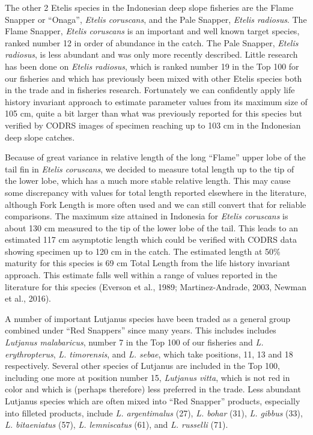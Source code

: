 The other 2 Etelis species in the Indonesian deep slope fisheries are the Flame Snapper or ``Onaga'', \textit{Etelis coruscans}, and the Pale Snapper, \textit{Etelis radiosus}. The Flame Snapper, \textit{Etelis coruscans} is an important and well known target species, ranked number 12 in order of abundance in the catch. The Pale Snapper, \textit{Etelis radiosus}, is less abundant and was only more recently described. Little research has been done on \textit{Etelis radiosus}, which is ranked number 19 in the Top 100 for our fisheries and which has previously been mixed with other Etelis species both in the trade and in fisheries research. Fortunately we can confidently apply life history invariant approach to estimate parameter values from its maximum size of 105 cm, quite a bit larger than what was previously reported for this species but verified by CODRS images of specimen reaching up to 103 cm in the Indonesian deep slope catches.

Because of great variance in relative length of the long ``Flame'' upper lobe of the tail fin in \textit{Etelis coruscans}, we decided to measure total length up to the tip of the lower lobe, which has a much more stable relative length. This may cause some discrepancy with values for total length reported elsewhere in the literature, although Fork Length is more often used and we can still convert that for reliable comparisons. The maximum size attained in Indonesia for \textit{Etelis coruscans} is about 130 cm measured to the tip of the lower lobe of the tail. This leads to an estimated 117 cm asymptotic length which could be verified with CODRS data showing specimen up to 120 cm in the catch. The estimated length at 50\% maturity for this species is 69 cm Total Length from the life history invariant approach. This estimate falls well within a range of values reported in the literature for this species (Everson et al., 1989; Martinez-Andrade, 2003, Newman et al., 2016).

A number of important Lutjanus species have been traded as a general group combined under ``Red Snappers'' since many years. This includes includes \textit{Lutjanus malabaricus}, number 7 in the Top 100 of our fisheries and \textit{L. erythropterus}, \textit{L. timorensis}, and \textit{L. sebae}, which take positions, 11, 13 and 18 respectively. Several other species of Lutjanus are included in the Top 100, including one more at position number 15, \textit{Lutjanus vitta}, which is not red in color and which is (perhaps therefore) less preferred in the trade. Less abundant Lutjanus species which are often mixed into ``Red Snapper'' products, especially into filleted products, include \textit{L. argentimalus} (27), \textit{L. bohar} (31), \textit{L. gibbus} (33), \textit{L. bitaeniatus} (57), \textit{L. lemniscatus} (61), and \textit{L. russelli} (71).

